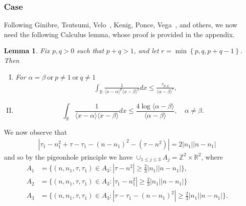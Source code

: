 \documentclass[12pt,reqno]{amsart}
\numberwithin{equation}{section}  %
\renewcommand{\cref}{\Cref}
\newcommand{\rr}{\mathbb{R}}
\newcommand{\zz}{\mathbb{Z}}
\newtheorem{lemma}[theorem]{Lemma}
\begin{document}
 \subsubsection{Case \cref{it-6}} 
\label{ssec:case-it-6}
Following Ginibre, Tsutsumi, Velo~\cite{Ginibre:1997jp}, Kenig, Ponce, Vega~\cite{Kenig:1996yn}, and others,
we now need the following Calculus lemma, whose proof is provided in the
appendix.
%
%
%
%
%
%
%
\begin{lemma}
	\label{lem:calc}
 Fix $p, q > 0$ such that $p +q >1$, and let $r =\min\left\{p, q, p+q-1
 \right\}$. Then 
 \begin{enumerate}[(I)]
   \item
For $\alpha=\beta \ \text{or} \ p \neq 1 \ \text{or} \ q \neq 1$
 \begin{equation*}
\begin{split}
  & \int_{\rr} \frac{1}{\langle x - \alpha \rangle ^{p} \langle x -
  \beta \rangle
  ^{q}} d x
  \le \frac{c_{p,q}}{\langle \alpha - \beta \rangle ^{r}}, 
  \end{split}
\end{equation*}
  \item
    \begin{equation*}
  \int_{\rr} \frac{1}{\langle x - \alpha \rangle  \langle x - \beta
  \rangle} d x
  \le  \frac{4 \log \langle \alpha - \beta \rangle}{\langle \alpha - \beta
  \rangle}, \quad \alpha \neq \beta.
\end{equation*}
\end{enumerate}
\end{lemma}
%
%
%
%
%
%
%
We now observe that
%
%
\begin{equation*}
\begin{split}
  | \tau_{1} - n_{1}^{2} + \tau - \tau_{1} - (n - n_{1})^{2} - (\tau - n^{2}) | = 2| n_{1} || n - n_{1} |
\end{split}
\end{equation*}
%
%
and so by the pigeonhole principle we have $\cup_{1 \le j \le 3} A_{j} = \zz^{2} \times \rr^{2}$, where 
\begin{align*}
  A_{1}&=\{(n, n_1, \tau, \tau_1)\in A_3: |\tau-n^{2}|\ge \frac{2}{3} |n_{1}|| n - n_{1} |\},\\
  A_{2}&=\{(n, n_1, \tau, \tau_1)\in A_3: |\tau_{1}-n_{1}^2|\ge \frac{2}{3} |n_{1}||n - n_{1}| \}\\
  A_{3}&=\{(n, n_1, \tau, \tau_1)\in A_3: |\tau - \tau_{1}-(n - n_{1})^2|\ge \frac{2}{3} |n_{1}||n - n_{1}| \}.
\end{align*} 
\end{document}
